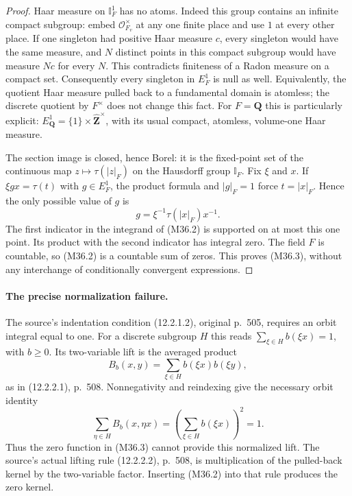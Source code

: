\begin{proof}
Haar measure on $\mathbb I_F^1$ has no atoms.
Indeed this group contains an infinite compact subgroup:
embed $\mathcal O_{F_v}^\times$ at any one finite place
and use $1$ at every other place.  If one singleton had
positive Haar measure $c$, every singleton would have
the same measure, and $N$ distinct points in this compact
subgroup would have measure $Nc$ for every $N$.
This contradicts finiteness of a Radon measure on a
compact set.  Consequently every singleton in $E_F^1$
is null as well.  Equivalently, the quotient Haar
measure pulled back to a fundamental domain is atomless;
the discrete quotient by $F^\times$ does not change this
fact.  For $F=\mathbf Q$ this is particularly explicit:
$E_{\mathbf Q}^1=\{1\}\times\widehat{\mathbf Z}^\times$,
with its usual compact, atomless, volume-one Haar measure.

The section image is closed, hence Borel: it is the
fixed-point set of the continuous map
$z\mapsto\tau(|z|_F)$ on the Hausdorff group
$\mathbb I_F$.  Fix $\xi$ and $x$.  If
$\xi gx=\tau(t)$ with $g\in E_F^1$, the product formula
and $|g|_F=1$ force $t=|x|_F$.  Hence the only possible
value of $g$ is
\[
                       g=\xi^{-1}\tau(|x|_F)x^{-1}.
 \tag{M36.4}
\]
The first indicator in the integrand of (M36.2) is
supported on at most this one point.  Its product with
the second indicator has integral zero.  The field
$F$ is countable, so (M36.2) is a countable sum of zeros.
This proves (M36.3), without any interchange of
conditionally convergent expressions.
\end{proof}

\paragraph{The precise normalization failure.}
The source's indentation condition (12.2.1.2), original
p.~505, requires an orbit integral equal to one.
For a discrete subgroup $H$ this reads
$\sum_{\xi\in H}b(\xi x)=1$, with $b\ge0$.
Its two-variable lift is the averaged product
\[
                    B_b(x,y)=\sum_{\xi\in H}b(\xi x)b(\xi y),
 \tag{M36.5}
\]
as in (12.2.2.1), p.~508.  Nonnegativity and reindexing
give the necessary orbit identity
\[
 \sum_{\eta\in H}B_b(x,\eta x)
    =\left(\sum_{\xi\in H}b(\xi x)\right)^2=1.
 \tag{M36.6}
\]
Thus the zero function in (M36.3) cannot provide this
normalized lift.  The source's actual lifting rule
(12.2.2.2), p.~508, is multiplication of the pulled-back
kernel by the two-variable factor.  Inserting (M36.2)
into that rule produces the zero kernel.

